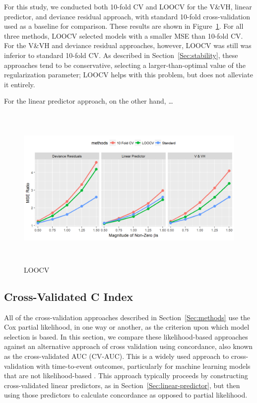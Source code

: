 For this study, we conducted both 10-fold CV and LOOCV for the V\&VH, linear predictor, and deviance residual approach, with standard 10-fold cross-validation used as a baseline for comparison.  These results are shown in Figure~\ref{Fig:loocv}.  For all three methods, LOOCV selected models with a smaller MSE than 10-fold CV. For the V\&VH and deviance residual approaches, however, LOOCV was still was inferior to standard 10-fold CV.  As described in Section~\ref{Sec:stability}, these approaches tend to be conservative, selecting a larger-than-optimal value of the regularization parameter; LOOCV helps with this problem, but does not alleviate it entirely.

For the linear predictor approach, on the other hand, \ldots {}

\begin{figure}[h]
  \centering
  \includegraphics[height= 8cm ]{./figures/figure_4.png}
  \caption{\label{Fig:loocv}LOOCV}
\end{figure}	

\subsection {Cross-Validated C Index}

\par All of the cross-validation approaches described in Section~\ref{Sec:methods} use the Cox partial likelihood, in one way or another, as the criterion upon which model selection is based.  In this section, we compare these likelihood-based approaches against an alternative approach of cross validation using concordance, also known as the cross-validated AUC (CV-AUC).  This is a widely used approach to cross-validation with time-to-event outcomes, particularly for machine learning models that are not likelihood-based \citep{Subramanian2011,Simon2011a}. This approach typically proceeds by constructing cross-validated linear predictors, as in Section~\ref{Sec:linear-predictor}, but then using those predictors to calculate concordance as opposed to partial likelihood.

